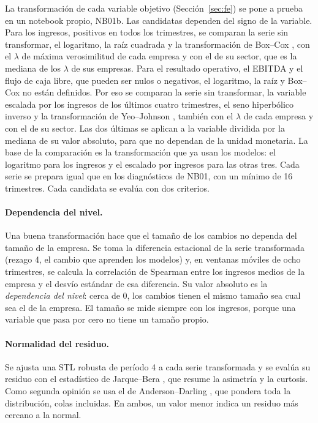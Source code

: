 \documentclass[12pt,letterpaper,oneside]{report}
\renewcommand{\_}{\UnderscoreOriginal\allowbreak}
\begin{document}
La transformación de cada variable objetivo (Sección~\ref{sec:fe}) se pone a prueba en un notebook propio, NB01b. Las candidatas dependen del signo de la variable. Para los ingresos, positivos en todos los trimestres, se comparan la serie sin transformar, el logaritmo, la raíz cuadrada y la transformación de Box--Cox \parencite{box1964transformations}, con el $\lambda$ de máxima verosimilitud de cada empresa y con el de su sector, que es la mediana de los $\lambda$ de sus empresas. Para el resultado operativo, el EBITDA y el flujo de caja libre, que pueden ser nulos o negativos, el logaritmo, la raíz y Box--Cox no están definidos. Por eso se comparan la serie sin transformar, la variable escalada por los ingresos de los últimos cuatro trimestres, el seno hiperbólico inverso \parencite{burbidge1988alternative} y la transformación de Yeo--Johnson \parencite{yeo2000new}, también con el $\lambda$ de cada empresa y con el de su sector. Las dos últimas se aplican a la variable dividida por la mediana de su valor absoluto, para que no dependan de la unidad monetaria. La base de la comparación es la transformación que ya usan los modelos: el logaritmo para los ingresos y el escalado por ingresos para las otras tres. Cada serie se prepara igual que en los diagnósticos de NB01, con un mínimo de 16 trimestres. Cada candidata se evalúa con dos criterios.

\paragraph{Dependencia del nivel.} Una buena transformación hace que el tamaño de los cambios no dependa del tamaño de la empresa. Se toma la diferencia estacional de la serie transformada (rezago 4, el cambio que aprenden los modelos) y, en ventanas móviles de ocho trimestres, se calcula la correlación de Spearman \parencite{spearman1904proof} entre los ingresos medios de la empresa y el desvío estándar de esa diferencia. Su valor absoluto es la \emph{dependencia del nivel}: cerca de 0, los cambios tienen el mismo tamaño sea cual sea el de la empresa. El tamaño se mide siempre con los ingresos, porque una variable que pasa por cero no tiene un tamaño propio.

\paragraph{Normalidad del residuo.} Se ajusta una STL robusta de período 4 \parencite{cleveland1990stl} a cada serie transformada y se evalúa su residuo con el estadístico de Jarque--Bera \parencite{jarque1987test}, que resume la asimetría y la curtosis. Como segunda opinión se usa el de Anderson--Darling \parencite{anderson1954test}, que pondera toda la distribución, colas incluidas. En ambos, un valor menor indica un residuo más cercano a la normal.
\end{document}
